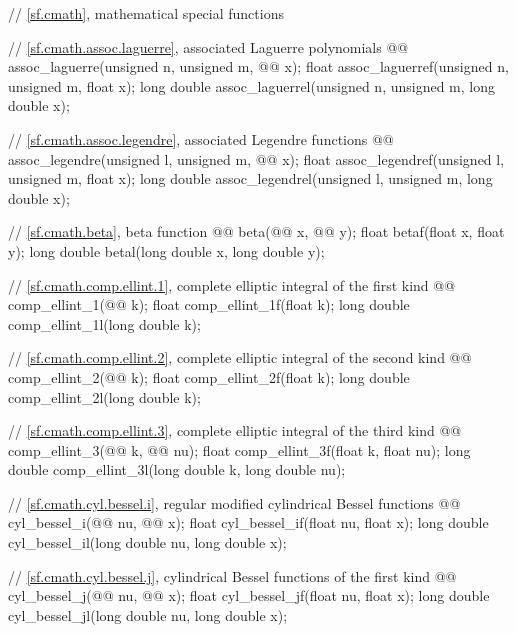 \begin{codeblock}
{  // \ref{sf.cmath}, mathematical special functions

  // \ref{sf.cmath.assoc.laguerre}, associated Laguerre polynomials
  @@ assoc_laguerre(unsigned n, unsigned m, @@ x);
  float        assoc_laguerref(unsigned n, unsigned m, float x);
  long double  assoc_laguerrel(unsigned n, unsigned m, long double x);

  // \ref{sf.cmath.assoc.legendre}, associated Legendre functions
  @@ assoc_legendre(unsigned l, unsigned m, @@ x);
  float        assoc_legendref(unsigned l, unsigned m, float x);
  long double  assoc_legendrel(unsigned l, unsigned m, long double x);

  // \ref{sf.cmath.beta}, beta function
  @@ beta(@@ x, @@ y);
  float        betaf(float x, float y);
  long double  betal(long double x, long double y);

  // \ref{sf.cmath.comp.ellint.1}, complete elliptic integral of the first kind
  @@ comp_ellint_1(@@ k);
  float        comp_ellint_1f(float k);
  long double  comp_ellint_1l(long double k);

  // \ref{sf.cmath.comp.ellint.2}, complete elliptic integral of the second kind
  @@ comp_ellint_2(@@ k);
  float        comp_ellint_2f(float k);
  long double  comp_ellint_2l(long double k);

  // \ref{sf.cmath.comp.ellint.3}, complete elliptic integral of the third kind
  @@ comp_ellint_3(@@ k, @@ nu);
  float        comp_ellint_3f(float k, float nu);
  long double  comp_ellint_3l(long double k, long double nu);

  // \ref{sf.cmath.cyl.bessel.i}, regular modified cylindrical Bessel functions
  @@ cyl_bessel_i(@@ nu, @@ x);
  float        cyl_bessel_if(float nu, float x);
  long double  cyl_bessel_il(long double nu, long double x);

  // \ref{sf.cmath.cyl.bessel.j}, cylindrical Bessel functions of the first kind
  @@ cyl_bessel_j(@@ nu, @@ x);
  float        cyl_bessel_jf(float nu, float x);
  long double  cyl_bessel_jl(long double nu, long double x);

}
\end{codeblock}
